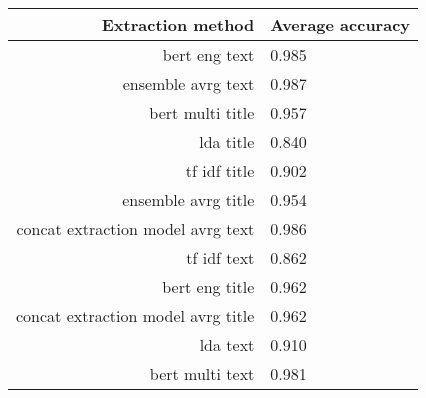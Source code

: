 \begin{tabular}{|r|l|}
  \hline
  Extraction method & Average accuracy \\ 
  \hline
  bert eng text & 0.985 \\ 
  \hline
  ensemble avrg text & 0.987 \\ 
  \hline
  bert multi title & 0.957 \\ 
  \hline
  lda title & 0.840 \\ 
  \hline
  tf idf title & 0.902 \\ 
  \hline
  ensemble avrg title & 0.954 \\ 
  \hline
  concat extraction model avrg text & 0.986 \\ 
  \hline
  tf idf text & 0.862 \\ 
  \hline
  bert eng title & 0.962 \\ 
  \hline
  concat extraction model avrg title & 0.962 \\ 
  \hline
  lda text & 0.910 \\ 
  \hline
  bert multi text & 0.981 \\ 
  \hline
\end{tabular}
